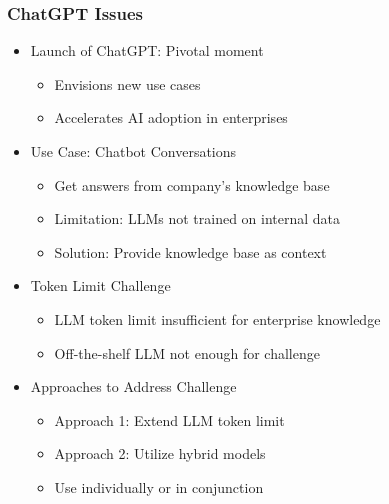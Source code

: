 \begin{frame}[fragile]\frametitle{ChatGPT Issues}

\begin{itemize}
    \item Launch of ChatGPT: Pivotal moment
    \begin{itemize}
        \item Envisions new use cases
        \item Accelerates AI adoption in enterprises
    \end{itemize}
    \item Use Case: Chatbot Conversations
    \begin{itemize}
        \item Get answers from company's knowledge base
        \item Limitation: LLMs not trained on internal data
        \item Solution: Provide knowledge base as context
    \end{itemize}
    \item Token Limit Challenge
    \begin{itemize}
        \item LLM token limit insufficient for enterprise knowledge
        \item Off-the-shelf LLM not enough for challenge
    \end{itemize}
    \item Approaches to Address Challenge
    \begin{itemize}
        \item Approach 1: Extend LLM token limit
        \item Approach 2: Utilize hybrid models
        \item Use individually or in conjunction
    \end{itemize}
\end{itemize}
\end{frame}

